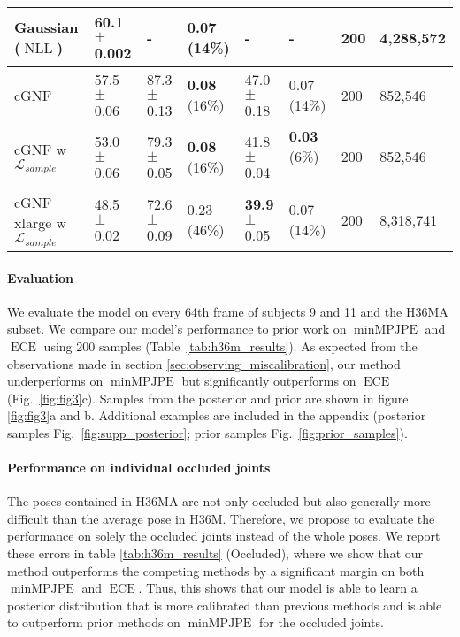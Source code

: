 \documentclass{article} \usepackage{iclr2023_conference,times}
\begin{document}
\begin{table}[h!]
\begin{tabular}{l|lll|ll|ll}
Gaussian ($\operatorname{NLL}$)       & 60.1 \tiny{$\pm$ 0.002}  & -       & 0.07 \tiny{(14\%)}  & -                  & -          & 200 & 4,288,572 \\
\midrule
cGNF                    & 57.5 \tiny{$\pm$ 0.06} & 87.3 \tiny{$\pm$ 0.13} & \textbf{0.08} \tiny{(16\%)}  & 47.0 \tiny{$\pm$ 0.18} & 0.07 \tiny{(14\%)}  & 200 & 852,546   \\
cGNF w $\mathcal{L}_{sample}$ & 53.0 \tiny{$\pm$ 0.06} & 79.3 \tiny{$\pm$ 0.05} & \textbf{0.08} \tiny{(16\%)}  & 41.8 \tiny{$\pm$ 0.04} & \textbf{0.03} \tiny{(6\%)}  \ \  & 200 & 852,546 \\
cGNF xlarge w $\mathcal{L}_{sample}$                                  & 48.5  \tiny{$\pm$ 0.02}                     & 72.6 \tiny{$\pm$ 0.09}                      & 0.23 \tiny{(46\%)}                        & \textbf{39.9} \tiny{$\pm$ 0.05}                                & 0.07 \tiny{(14\%)}                      & 200                      & 8,318,741 \\
\bottomrule
\end{tabular}
\end{table}

\paragraph{Evaluation}
We evaluate the model on every 64th frame of subjects 9 and 11 and the H36MA subset.
We compare our model's performance to prior work on $\operatorname{minMPJPE}$ and $\operatorname{ECE}$ using 200 samples (Table~\ref{tab:h36m_results}).
As expected from the observations made in section \ref{sec:observing_miscalibration}, our method underperforms on $\operatorname{minMPJPE}$ but significantly outperforms on $\operatorname{ECE}$ (Fig.~\ref{fig:fig3}c).
Samples from the posterior and prior are shown in figure \ref{fig:fig3}a and b.
Additional examples are included in the appendix (posterior samples Fig.~\ref{fig:supp_posterior}; prior samples Fig.~\ref{fig:prior_samples}).

\paragraph{Performance on individual occluded joints}
The poses contained in H36MA are not only occluded but also generally more difficult than the average pose in H36M.
Therefore, we propose to evaluate the performance on solely the occluded joints instead of the whole poses.
We report these errors in table \ref{tab:h36m_results} (Occluded), where we show that our method outperforms the competing methods by a significant margin on both $\operatorname{minMPJPE}$ and $\operatorname{ECE}$.
Thus, this shows that our model is able to learn a posterior distribution that is more calibrated than previous methods and is able to outperform prior methods on $\operatorname{minMPJPE}$ for the occluded joints.
\end{document}
